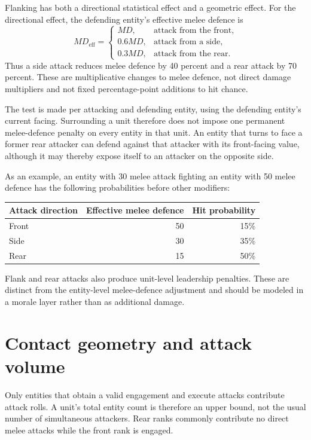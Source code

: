 \documentclass[11pt]{article}
\begin{document}
Flanking has both a directional statistical effect and a geometric effect.
For the directional effect, the defending entity's effective melee defence is
\begin{equation}
  MD_{\mathrm{eff}} =
  \begin{cases}
    MD,     & \text{attack from the front},\\
    0.6 MD, & \text{attack from a side},\\
    0.3 MD, & \text{attack from the rear}.
  \end{cases}
  \label{eq:directional-md}
\end{equation}
Thus a side attack reduces melee defence by 40 percent and a rear attack by
70 percent.  These are multiplicative changes to melee defence, not direct
damage multipliers and not fixed percentage-point additions to hit chance.

The test is made per attacking and defending entity, using the defending
entity's current facing.  Surrounding a unit therefore does not impose one
permanent melee-defence penalty on every entity in that unit.  An entity that
turns to face a former rear attacker can defend against that attacker with its
front-facing value, although it may thereby expose itself to an attacker on
the opposite side.

As an example, an entity with 30 melee attack fighting an entity with 50 melee
defence has the following probabilities before other modifiers:
\begin{center}
  \begin{tabular}{lrr}
    \toprule
    Attack direction & Effective melee defence & Hit probability \\
    \midrule
    Front & 50 & 15\% \\
    Side  & 30 & 35\% \\
    Rear  & 15 & 50\% \\
    \bottomrule
  \end{tabular}
\end{center}

Flank and rear attacks also produce unit-level leadership penalties.  These
are distinct from the entity-level melee-defence adjustment and should be
modeled in a morale layer rather than as additional damage.

\section{Contact geometry and attack volume}

Only entities that obtain a valid engagement and execute attacks contribute
attack rolls.  A unit's total entity count is therefore an upper bound, not
the usual number of simultaneous attackers.  Rear ranks commonly contribute
no direct melee attacks while the front rank is engaged.
\end{document}
